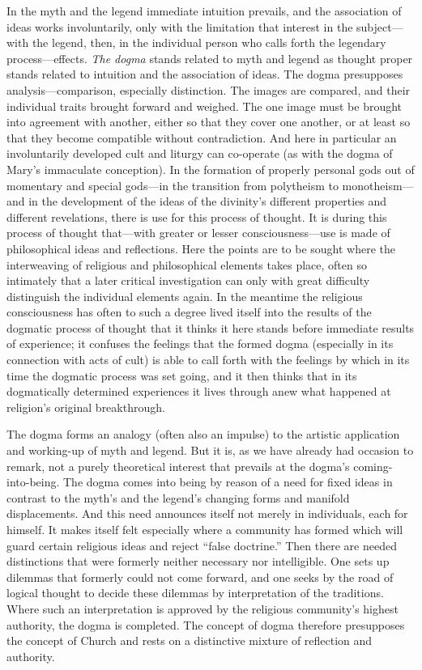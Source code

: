 \documentclass[12pt,a4paper]{book}
\newcommand{\opage}[1]{\marginnote{\footnotesize\textit{[#1]}}}
\begin{document}
In the myth and the legend immediate intuition prevails, and the association of ideas works
involuntarily, only with the limitation that interest in the subject---with the legend, then, in
the individual person who calls forth the legendary process---effects. \emph{The dogma} stands
related to myth and legend as thought proper stands related to intuition and the association of
ideas. The dogma presupposes analysis---comparison, especially distinction. The images are
compared, and their individual traits brought forward and weighed. The one image must be brought
into agreement with 
\opage{135}another, either so that they cover one another, or at least so that they
become compatible without contradiction. And here in particular an involuntarily developed cult
and liturgy can co-operate (as with the dogma of Mary's immaculate conception). In the formation
of properly personal gods out of momentary and special gods---in the transition from polytheism
to monotheism---and in the development of the ideas of the divinity's different properties and
different revelations, there is use for this process of thought. It is during this process of
thought that---with greater or lesser consciousness---use is made of philosophical ideas and
reflections. Here the points are to be sought where the interweaving of religious and
philosophical elements takes place, often so intimately that a later critical investigation can
only with great difficulty distinguish the individual elements again. In the meantime the
religious consciousness has often to such a degree lived itself into the results of the dogmatic
process of thought that it thinks it here stands before immediate results of experience; it
confuses the feelings that the formed dogma (especially in its connection with acts of cult) is
able to call forth with the feelings by which in its time the dogmatic process was set going, and
it then thinks that in its dogmatically determined experiences it lives through anew what happened
at religion's original breakthrough.

The dogma forms an analogy (often also an impulse) to the artistic application and working-up of
myth and legend. But it is, as we have already had occasion to remark, not a purely theoretical
interest that prevails at the dogma's coming-into-being. The dogma comes into being by reason of a
need for fixed ideas in contrast to the myth's and the legend's changing forms and manifold
displacements. And this need announces itself not merely in individuals, each for himself. It makes
itself felt especially where a community has formed which will guard certain religious ideas and
reject ``false doctrine.'' Then there are needed distinctions that were formerly neither necessary
nor intelligible. One sets up dilemmas that formerly could not come forward, and one seeks by the
road of logical thought to decide these dilemmas by interpretation of the traditions. Where such an
interpretation is approved by the religious community's highest authority, the dogma is completed.
The concept of dogma therefore presupposes the concept of Church and rests on a distinctive mixture
of reflection and authority.
\end{document}
